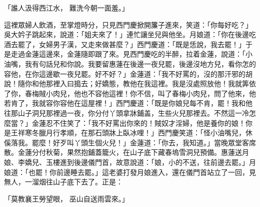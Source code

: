 \begin{showcontents}{}
「誰人汲得西江水，  難洗今朝一面羞。」

這裡眾婦人飲酒，至掌燈時分，只見西門慶掀開簾子進來，笑道：「你每好吃？」吳大妗子跳起來，說道：「姐夫來了！」連忙讓坐兒與他坐。月娘道：「你在後邊吃酒去罷了，女婦男子漢，又走來做甚麼？」西門慶道：「既是恁說，我去罷！」于是走過金蓮這邊來，金蓮隨即跟了來。見西門慶吃的半醉，拉着金蓮，說道：「小油嘴，我有句話兒和你說。我要留惠蓮在後邊一夜兒罷，後邊沒地方兒，看你怎的容他，在你這邊歇一夜兒罷。好不好？」金蓮道：「我不好罵的，沒的那汗邪的胡說！隨你和他那裡入曰搗去；好嬌態，教他在我這裡。我是沒處照放他！我就筭依了你，春梅賊小肉兒，他也不容他這裡！你不信，叫了春梅小肉兒，問了他來，他若肯了，我就容你容他在這屋裡！」西門慶道：「既是你娘兒每不肯，罷！我和他往那山子洞兒那裡過一夜，你分付丫頭拿牀鋪盖，生些火兒那裡去。不然這一冷怎麼當？」金蓮忍不住笑了：「我不好罵出你來的！賊奴才淫婦，他是養你的娘！你是王祥寒冬臘月行孝順，在那石頭牀上臥冰哩！」西門慶笑道：「怪小油嘴兒，休傒落我。罷麼！好歹叫丫頭生個火兒！」金蓮道：「你去，我知道。」當晚眾堂客席散。金蓮分付秋菊，果然抱鋪蓋籠火，在山子底下藏春塢雪洞兒預備。惠蓮送月娘、李嬌兒、玉樓進到後邊儀門首，故意說道：「娘，小的不送，往前邊去罷。」月娘道：「也罷！你前邊睡去罷。」這老婆打發月娘進入，還在儀門首站立了一回，見無人，一溜烟往山子底下去了。正是：

「莫教襄王勞望眼，  巫山自送雨雲來。」


\end{showcontents}
